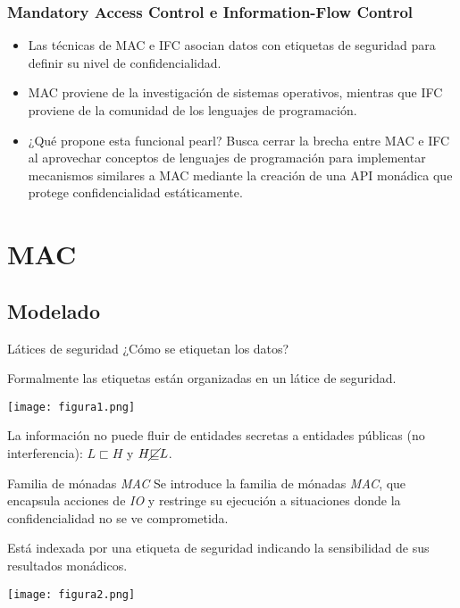 \documentclass{beamer}
\begin{document}
\begin{frame}
    \frametitle{Mandatory Access Control e Information-Flow Control}
    \pause
    \begin{itemize}
        \item<2-> Las técnicas de MAC e IFC asocian datos con etiquetas de seguridad para definir su nivel de confidencialidad.
        \item<3-> MAC proviene de la investigación de sistemas operativos, mientras que IFC proviene de la comunidad de los lenguajes de programación.
        \item<4-> ¿Qué propone esta funcional pearl? \pause[5]Busca cerrar la brecha entre MAC e IFC al aprovechar conceptos de lenguajes de programación para implementar mecanismos similares a MAC mediante la creación de una API monádica que protege confidencialidad estáticamente.
    \end{itemize}
\end{frame}

\section{\textbf{MAC}}

\subsection{Modelado}

\begin{frame}{Látices de seguridad}
\pause
    ¿Cómo se etiquetan los datos?
    \pause[3]
    
    Formalmente las etiquetas están organizadas en un látice de seguridad.

    \pause[4]
    \begin{center}
        \texttt{[image: figura1.png]}
    \end{center}

    \pause[5]
    La información no puede fluir de entidades secretas a entidades públicas (no interferencia): $L \sqsubset H$ y $H \cancel{\sqsubseteq} L$.
    
\end{frame}

\begin{frame}{Familia de mónadas \textit{MAC}}
\pause 
    Se introduce la familia de mónadas \textit{MAC}, que encapsula acciones de \textit{IO} y restringe su ejecución a situaciones donde la confidencialidad no se ve comprometida. 

    Está indexada por una etiqueta de seguridad indicando la sensibilidad de sus resultados monádicos. 

\pause[3]
    \begin{center}
        \texttt{[image: figura2.png]}
    \end{center}
\end{frame}
\end{document}
